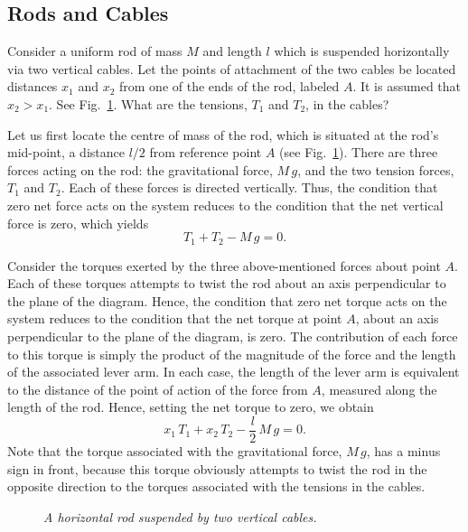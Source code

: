 \subsection{Rods and Cables}
Consider a uniform rod of mass $M$ and length $l$ which is suspended horizontally
via two vertical cables. Let the points of attachment of the two cables be located
distances $x_1$ and $x_2$ from one of the ends of the rod, labeled $A$. It is assumed that $x_2>x_1$.
See Fig.~\ref{f92}.
What are the tensions, $T_1$ and $T_2$, in the cables?

Let us first locate the centre of mass of the rod, which is situated at the rod's mid-point,
 a distance $l/2$ from  reference point $A$ (see Fig.~\ref{f92}). There are
three forces acting on the rod: the gravitational force, $M\,g$, and the two tension forces,
$T_1$ and $T_2$. Each of these forces is directed vertically. Thus, the condition that zero net force
acts on the system reduces to the condition that the net vertical force is zero, which yields
\begin{equation}
T_1 + T_2 - M\,g = 0.
\end{equation}

Consider the torques exerted by the three above-mentioned forces about point $A$. Each of these
torques attempts to twist the rod about an axis perpendicular to the plane of the  diagram.
Hence, the condition that zero net torque acts on the system reduces to the condition that
the net torque at point $A$, about an axis perpendicular to the plane of the diagram, is zero. The contribution
of each force to this torque is simply the product of the magnitude of the force and the
length of the associated lever arm. In each case, the length of the lever arm is equivalent to
the distance of the point of action of the force from $A$, measured along the length of the rod. 
Hence, setting the net torque to zero, we obtain
\begin{equation}
x_1\,T_1 + x_2\,T_2 - \frac{l}{2}\,M\,g = 0.
\end{equation}
Note that the torque associated with the gravitational force, $M\,g$, has a minus sign in front, because
this torque obviously attempts to twist the rod in the opposite direction to the torques
associated with the tensions in the cables.

\begin{figure}
\epsfysize=2.5in
\centerline{}
\caption{\em A horizontal rod suspended by two vertical cables.}\label{f92}  
\end{figure}

